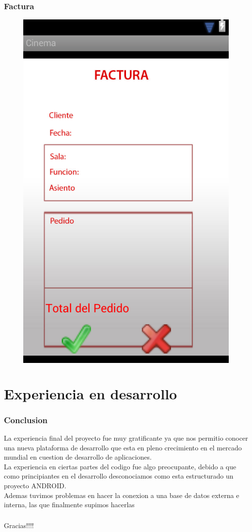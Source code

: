 \documentclass{beamer}
\begin{document}
\begin{frame}[allowframbreaks]
\frametitle{Factura}
\begin{figure}[h]
\centering
\includegraphics[height=0.8\textheight]{factura.png}
\end{figure}
\end{frame}

\section{Experiencia en desarrollo}
\begin{frame}[allowframebreaks]
\frametitle{Conclusion}
La experiencia final del proyecto fue muy gratificante ya que nos permitio conocer una nueva
plataforma de desarrollo que esta en pleno crecimiento en el mercado mundial en cuestion de
desarrollo de aplicaciones.\\
La experiencia en ciertas partes del codigo fue algo preocupante, debido a que como principiantes
en el desarrollo desconociamos como esta estructurado un proyecto ANDROID.\\
Ademas tuvimos problemas en hacer la conexion a una base de datos externa e interna, las que
finalmente supimos hacerlas
\end{frame}

\begin{frame}[allowframbreaks]
\frametitle{}
Gracias!!!!
\end{frame}
\end{document}
